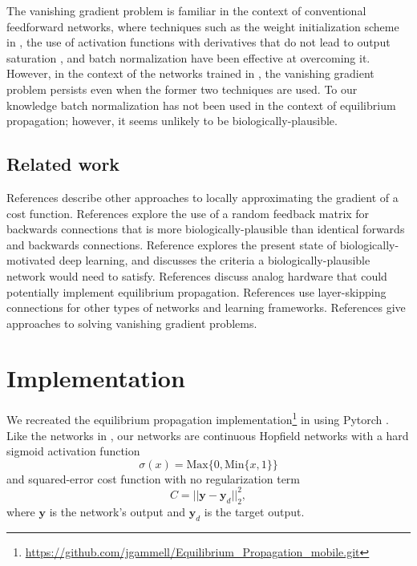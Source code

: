 \documentclass[utf8]{frontiersSCNS}
\newcommand{\mtx}[1]{\bm{#1}}
\begin{document}
The vanishing gradient problem is familiar in the context of conventional feedforward networks, where techniques such as the weight initialization scheme in \citep{glorot2010}, the use of activation functions with derivatives that do not lead to output saturation \citep{schmidhuber2015}, and batch normalization \citep{ioffe2015} have been effective at overcoming it. However, in the context of the networks trained in \citep{scellier17}, the vanishing gradient problem persists even when the former two techniques are used. To our knowledge batch normalization has not been used in the context of equilibrium propagation; however, it seems unlikely to be biologically-plausible.

\subsection{Related work}

References \citep{lee2015, xie2003, pineda1987} describe other approaches to locally approximating the gradient of a cost function. References \citep{lillicrap2014, crafton2019} explore the use of a random feedback matrix for backwards connections that is more biologically-plausible than identical forwards and backwards connections. Reference \citep{bartunov2018} explores the present state of biologically-motivated deep learning, and \citep{bengio2015} discusses the criteria a biologically-plausible network would need to satisfy. References \citep{shainline2019, davies2018, nahmias2013} discuss analog hardware that could potentially implement equilibrium propagation. References \citep{he2015, srivastava2015, xiaohu2011, krishnan2019} use layer-skipping connections for other types of networks and learning frameworks. References \citep{ioffe2015, glorot2010} give approaches to solving vanishing gradient problems.

\section{Implementation}
\label{sec:implementation}

We recreated the equilibrium propagation implementation\footnote{\url{https://github.com/jgammell/Equilibrium_Propagation_mobile.git}} in \citep{scellier17} using Pytorch \citep{pytorch2019}. Like the networks in \citep{scellier17}, our networks are continuous Hopfield networks with a hard sigmoid activation function $$\sigma(x)=\text{Max}\{0, \text{Min}\{x, 1\}\}$$ and squared-error cost function with no regularization term $$C=||\mtx{y}-\mtx{y}_d||_2^2,$$ where $\mtx{y}$ is the network's output and $\mtx{y}_d$ is the target output.
\end{document}
